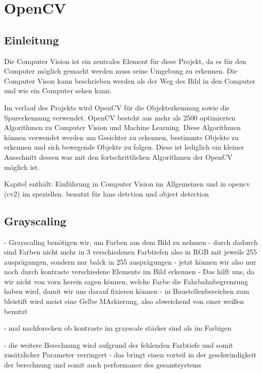 \chapter{OpenCV} %



\section{Einleitung}
Die Computer Vision ist ein zentrales Element für diese Projekt, da es für den Computer möglich gemacht werden muss seine Umgebung zu erkennen.
Die Computer Vison kann beschrieben werden als der Weg des Bild in den Computer und wie ein Computer sehen kann. \cite{Priese2015}

Im verlauf des Projekts wird \ac{OpenCV} für die Objekterkennung sowie die Spurerkennung verwendet.
\ac{OpenCV} besteht aus mehr als 2500 optimierten Algorithmen zu Computer Vision und Machine Learning. 
Diese Algorithmen können verwendet werden um Gesichter zu erkennen, bestimmte Objekte zu erkennen und sich bewegende Objekte zu folgen. 
Diese ist lediglich ein kleiner Ausschnitt dessen was mit den fortschrittlichen Algorithmen der \ac{OpenCV} möglich ist.   \cite{OpenCV.2020}  



Kapitel enthält: Einführung in Computer Vision im Allgemeinen und in opencv (cv2) im speziellen.
benutzt für lane detction und object detection


\section{Grayscaling}\label{sec:greyscaling} %
- Grayscaling benötigen wir, um Farben aus dem Bild zu nehmen
- durch dadurch sind Farben nicht mehr in 3 verschiedenen Farbtiefen also in RGB mit jeweils 255 ausprägungen, sondern nur balck in 255 ausprägungen
- jetzt können wir also nur noch durch kontraste verschiedene Elemente im Bild erkennen
- Das hilft uns, da wir nicht von vorn herein sagen können, welche Farbe die Fahrbahnbegrenzung haben wird, damit wir uns darauf fixieren können
- in Baustellenbereichen zum bleistift wird meist eine Gelbe MArkierung, also abweichend von einer weißen benutzt

- mal nachforschen ob kontraste im grayscale stärker sind als im Farbigen

- die weitere Berechnung wird aufgrund der fehlenden Farbtiefe und somit zusätzlicher Parameter verringert
- das bringt einen vorteil in der geschwindigkeit der berechnung und somit auch performance des gesamtsystems

